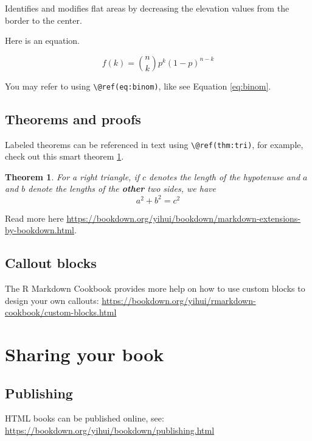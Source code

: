 \documentclass[
]{book}
\newtheorem{theorem}{Theorem}[chapter]
\theoremstyle{definition}
\theoremstyle{definition}
\theoremstyle{definition}
\theoremstyle{definition}
\theoremstyle{remark}
\begin{document}
Identifies and modifies flat areas by decreasing the elevation values from the border to the center.

Here is an equation.

\begin{equation} 
  f\left(k\right) = \binom{n}{k} p^k\left(1-p\right)^{n-k}
  \label{eq:binom}
\end{equation}

You may refer to using \texttt{\textbackslash{}@ref(eq:binom)}, like see Equation \eqref{eq:binom}.

\section{Theorems and proofs}\label{theorems-and-proofs}

Labeled theorems can be referenced in text using \texttt{\textbackslash{}@ref(thm:tri)}, for example, check out this smart theorem \ref{thm:tri}.

\begin{theorem}
\protect\hypertarget{thm:tri}{}\label{thm:tri}For a right triangle, if \(c\) denotes the \emph{length} of the hypotenuse
and \(a\) and \(b\) denote the lengths of the \textbf{other} two sides, we have
\[a^2 + b^2 = c^2\]
\end{theorem}

Read more here \url{https://bookdown.org/yihui/bookdown/markdown-extensions-by-bookdown.html}.

\section{Callout blocks}\label{callout-blocks}

The R Markdown Cookbook provides more help on how to use custom blocks to design your own callouts: \url{https://bookdown.org/yihui/rmarkdown-cookbook/custom-blocks.html}

\chapter{Sharing your book}\label{sharing-your-book}

\section{Publishing}\label{publishing}

HTML books can be published online, see: \url{https://bookdown.org/yihui/bookdown/publishing.html}
\end{document}
